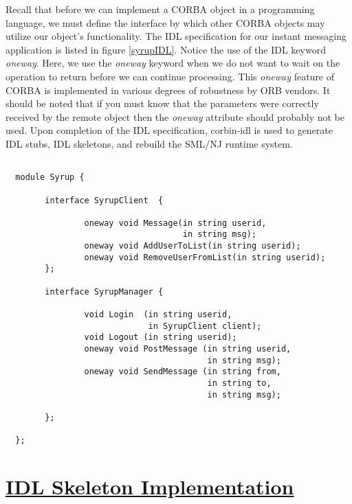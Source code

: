 Recall that before we can implement a CORBA object in a programming 
language, we must define the interface by which other CORBA objects 
may utilize our object's functionality. The IDL specification for 
our instant messaging application is listed in figure \ref{syrupIDL}.
Notice the use of the IDL keyword {\em{oneway}}.
Here, we use the {\em{oneway}} keyword when we do not want to wait on 
the operation to return before we can continue processing.  This 
{\em{oneway}} feature of CORBA is implemented in various degrees 
of robustness by ORB vendors. It should be noted that if you must 
know that the parameters were correctly received by the remote 
object then the {\em{oneway}} attribute should probably not be used. 
Upon completion of the IDL specification, corbin-idl is used to 
generate IDL stubs, IDL skeletons, and rebuild the SML/NJ runtime 
system. 
\begin{figure*}[t]
\singlespace
\begin{verbatim}

  module Syrup {

        interface SyrupClient  {

                oneway void Message(in string userid, 
                                    in string msg);	
                oneway void AddUserToList(in string userid); 
                oneway void RemoveUserFromList(in string userid); 
        };

        interface SyrupManager {
	
                void Login  (in string userid, 
                             in SyrupClient client); 
                void Logout (in string userid);		
                oneway void PostMessage (in string userid, 
                                         in string msg);
                oneway void SendMessage (in string from, 
                                         in string to,
                                         in string msg);

        };

  };

\end{verbatim}
\doublespace
\caption {{\em IDL specification for the S$.$Y$.$R$.$U$.$P$.$ Instant Messaging Application}.}
\figline
        \label{syrupIDL}
\end{figure*}



\section*{\underline{IDL Skeleton Implementation}}

